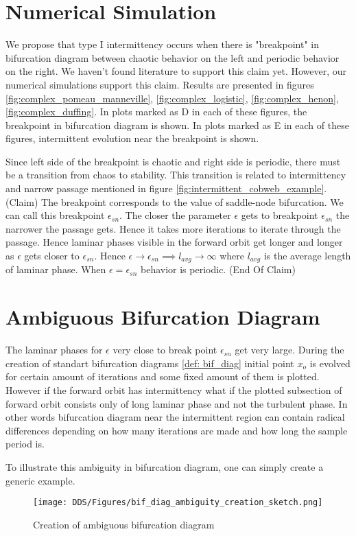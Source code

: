 \section{Numerical Simulation}
We propose that type I intermittency occurs when there is "breakpoint" in bifurcation diagram between chaotic behavior on the left and periodic behavior on the right.
We haven't found literature to support this claim yet.
However, our numerical simulations support this claim.
Results are presented in figures \ref{fig:complex_pomeau_manneville}, \ref{fig:complex_logistic}, \ref{fig:complex_henon}, \ref{fig:complex_duffing}.
In plots marked as D in each of these figures, the breakpoint in bifurcation diagram is shown.
In plots marked as E in each of these figures, intermittent evolution near the breakpoint is shown.
\par
Since left side of the breakpoint is chaotic and right side is periodic, there must be a transition from chaos to stability.
This transition is related to intermittency and narrow passage mentioned in figure \ref{fig:intermittent_cobweb_example}.
(Claim) The breakpoint corresponds to the value of saddle-node bifurcation.
We can call this breakpoint $\epsilon_{sn}$.
The closer the parameter $\epsilon$ gets to breakpoint $\epsilon_{sn}$ the narrower the passage gets.
Hence it takes more iterations to iterate through the passage.
Hence laminar phases visible in the forward orbit get longer and longer as $\epsilon$ gets closer to $\epsilon_{sn}$.
Hence $\epsilon \rightarrow \epsilon_{sn} \implies l_{avg} \rightarrow \infty$ where $l_{avg}$ is the average length of laminar phase.
When $\epsilon = \epsilon_{sn}$ behavior is periodic.
(End Of Claim)

\section{Ambiguous Bifurcation Diagram}
The laminar phases for $\epsilon$ very close to break point $\epsilon_{sn}$ get very large.
During the creation of standart bifurcation diagrams \ref{def: bif_diag} initial point $x_o$ is evolved for certain amount of iterations and some fixed amount of them is plotted.
However if the forward orbit has intermittency what if the plotted subsection of forward orbit consists only of long laminar phase and not the turbulent phase.
In other words bifurcation diagram near the intermittent region can contain radical differences depending on how many iterations are made and how long the sample period is.
\par
To illustrate this ambiguity in bifurcation diagram, one can simply create a generic example.
\begin{figure}[!h]
    \centering
    \texttt{[image: DDS/Figures/bif\_diag\_ambiguity\_creation\_sketch.png]}
    \caption{Creation of ambiguous bifurcation diagram}
    \label{fig:ambiguous_bif_diag}
\end{figure}

